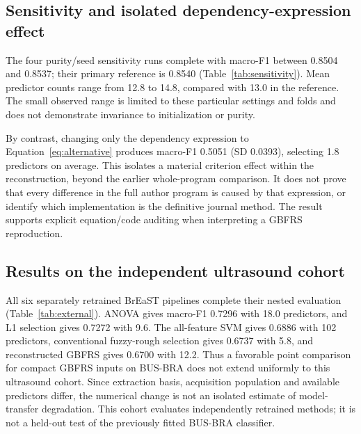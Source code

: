 \documentclass[11pt,a4paper]{article}
\begin{document}
\subsection{Sensitivity and isolated dependency-expression effect}\label{sec:ablationresults}
The four purity/seed sensitivity runs complete with macro-F1 between 0.8504 and 0.8537; their primary reference is 0.8540 (Table~\ref{tab:sensitivity}). Mean predictor counts range from 12.8 to 14.8, compared with 13.0 in the reference. The small observed range is limited to these particular settings and folds and does not demonstrate invariance to initialization or purity.

By contrast, changing only the dependency expression to Equation~\ref{eq:alternative} produces macro-F1 0.5051 (SD 0.0393), selecting 1.8 predictors on average. This isolates a material criterion effect within the reconstruction, beyond the earlier whole-program comparison. It does not prove that every difference in the full author program is caused by that expression, or identify which implementation is the definitive journal method. The result supports explicit equation/code auditing when interpreting a GBFRS reproduction.
\begin{table}[htbp]\centering\small
\setlength{\tabcolsep}{3pt}\SensitivityTable
\caption{Separate nested GBFRS sensitivity runs and a controlled dependency ablation. ``Own'' uses Equation~\ref{eq:gb}; the alternative uses Equation~\ref{eq:alternative} with the same reconstruction ball-construction procedure. No setting is selected using outer outcomes.}\label{tab:sensitivity}
\end{table}

\subsection{Results on the independent ultrasound cohort}\label{sec:externalresults}
All six separately retrained BrEaST pipelines complete their nested evaluation (Table~\ref{tab:external}). ANOVA gives macro-F1 0.7296 with 18.0 predictors, and L1 selection gives 0.7272 with 9.6. The all-feature SVM gives 0.6886 with 102 predictors, conventional fuzzy-rough selection gives 0.6737 with 5.8, and reconstructed GBFRS gives 0.6700 with 12.2. Thus a favorable point comparison for compact GBFRS inputs on BUS-BRA does not extend uniformly to this ultrasound cohort. Since extraction basis, acquisition population and available predictors differ, the numerical change is not an isolated estimate of model-transfer degradation. This cohort evaluates independently retrained methods; it is not a held-out test of the previously fitted BUS-BRA classifier.
\begin{table}[htbp]\centering\small
\setlength{\tabcolsep}{3pt}\ExternalTable
\caption{BrEaST: 252 lesion cases from distinct patients, 102 separately extracted original-image features and five stratified outer folds. Values are fold means and sample SDs. Three-setting selectors search 96 joint configurations, fixed selectors 32. No source images, patient rows or predictions are publicly exported.}\label{tab:external}
\end{table}
\end{document}
